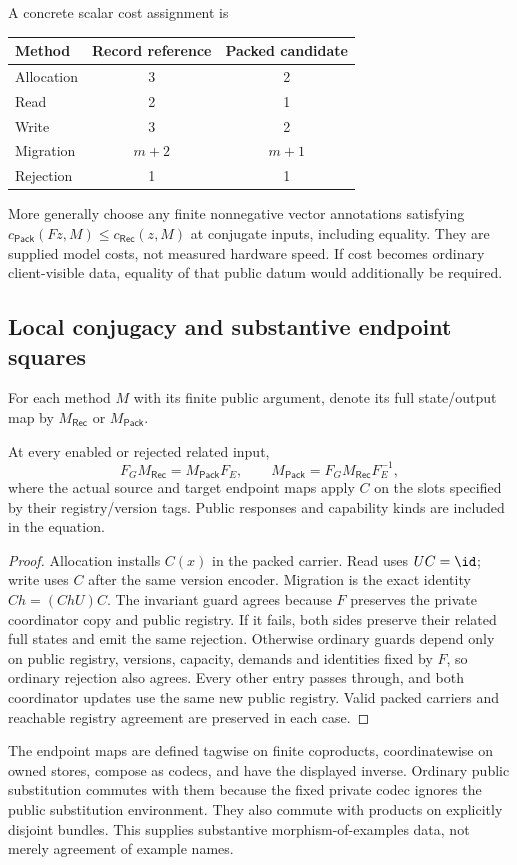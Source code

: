 A concrete scalar cost assignment is
\begin{center}
\begin{tabular}{@{}lcc@{}}
\toprule Method&Record reference&Packed candidate\\\midrule
Allocation&3&2\\
Read&2&1\\
Write&3&2\\
Migration&$m+2$&$m+1$\\
Rejection&1&1\\
\bottomrule
\end{tabular}
\end{center}
More generally choose any finite nonnegative vector annotations satisfying
$c_{\mathsf{Pack}}(Fz,M)\leq c_{\mathsf{Rec}}(z,M)$ at conjugate inputs,
including equality. They are supplied model costs, not measured hardware
speed. If cost becomes ordinary client-visible data, equality of that
public datum would additionally be required.

\subsection{Local conjugacy and substantive endpoint squares}
For each method $M$ with its finite public argument, denote its full
state/output map by $M_{\mathsf{Rec}}$ or $M_{\mathsf{Pack}}$.
\begin{proposition}\label{prop:B-conjugacy}
At every enabled or rejected related input,
\[
F_GM_{\mathsf{Rec}}=M_{\mathsf{Pack}}F_E,
\qquad
M_{\mathsf{Pack}}=F_GM_{\mathsf{Rec}}F_E^{-1},
\]
where the actual source and target endpoint maps apply $C$ on the slots
specified by their registry/version tags. Public responses and capability
kinds are included in the equation.
\end{proposition}
\begin{proof}
Allocation installs $C(x)$ in the packed carrier. Read uses $UC=\id$;
write uses $C$ after the same version encoder. Migration is the exact
identity $Ch=(ChU)C$. The invariant guard agrees because $F$ preserves the private coordinator
copy and public registry. If it fails, both sides preserve their related
full states and emit the same rejection. Otherwise ordinary guards depend
only on public registry, versions, capacity, demands and identities fixed
by $F$, so ordinary rejection also agrees.
Every other entry passes through, and both coordinator updates use the
same new public registry. Valid packed carriers and reachable registry
agreement are preserved in each case.
\end{proof}
The endpoint maps are defined tagwise on finite coproducts, coordinatewise
on owned stores, compose as codecs, and have the displayed inverse.
Ordinary public substitution commutes with them because the fixed private
codec ignores the public substitution environment. They also commute with
products on explicitly disjoint bundles. This supplies substantive
morphism-of-examples data, not merely agreement of example names.


